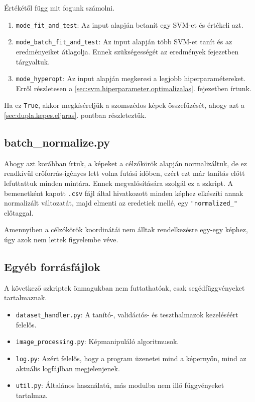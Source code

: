 Értékétől függ mit fogunk számolni.
\begin{enumerate}
\item 
	\texttt{mode\_fit\_and\_test}: Az input alapján betanít egy SVM-et és értékeli azt.
\item
	 \texttt{mode\_batch\_fit\_and\_test}: Az input alapján több SVM-et tanít és az eredményeiket átlagolja.
	 Ennek szükségességét az eredmények fejezetben tárgyaltuk.
\item 
	\texttt{mode\_hyperopt}: Az input alapján megkeresi a legjobb hiperparamétereket. 
	Erről részletesen a \ref{sec:svm.hiperparameter.optimalizalas}. fejezetben írtunk.
\end{enumerate}



Ha ez \texttt{True}, akkor megkíséreljük a szomszédos képek összefűzését, ahogy azt
a \ref{sec:dupla.kepes.eljaras}. pontban részleteztük.


\subsection{batch\_normalize.py}

Ahogy azt korábban írtuk, a képeket a célzókörök alapján normalizáltuk, de ez rendkívül 
erőforrás-igényes lett volna futási időben, ezért ezt már tanítás előtt lefuttattuk minden
mintára. Ennek megvalósítására szolgál ez a szkript. A bemenetként kapott \texttt{.csv} 
fájl által hivatkozott minden képhez elkészíti annak normalizált változatát, majd elmenti
az eredetiek mellé, egy \texttt{"normalized\_"} előtaggal.

Amennyiben a célzókörök koordinátái nem álltak rendelkezésre egy-egy képhez, úgy azok nem
lettek figyelembe véve.


\subsection{Egyéb forrásfájlok}

A következő szkriptek önmagukban nem futtathatóak, csak segédfüggvényeket tartalmaznak.

\begin{itemize}
\item 
	\texttt{dataset\_handler.py}: A tanító-, validációs- és teszthalmazok kezeléséért felelős.
\item 
	\texttt{image\_processing.py}: Képmanipuláló algoritmusok.
	
\item 
	\texttt{log.py}: Azért felelős, hogy a program üzenetei mind a képernyőn, mind 
	az aktuális logfájlban megjelenjenek.
\item 
	\texttt{util.py}: Általános használatú, más modulba nem illő függvényeket tartalmaz.
\end{itemize}


